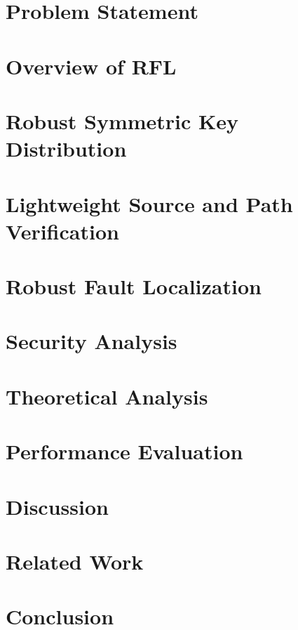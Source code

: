 \documentclass[journal]{IEEEtran}
\newcommand{\name}{RFL}
\begin{document}
\section{Problem Statement}
\label{problemstatement}

\section{Overview of \name{}}
\label{spmoniprotocoloverview}

\vspace{-0.1in}
\section{Robust Symmetric Key Distribution}
\label{lakeysection}

\section{Lightweight Source and Path Verification}
\label{sourceandpathverificationsection}

\section{Robust Fault Localization}
\label{faultlocalization}

\section{Security Analysis}
\label{securityanalysis}

\section{Theoretical Analysis}
\label{theoreticalanalysis}

\section{Performance Evaluation}
\label{performanceevaluation}

\section{Discussion}
\label{discussion}

\section{Related Work}
\label{relatedwork}

\section{Conclusion}
\label{conclusionsection}



\end{document}
